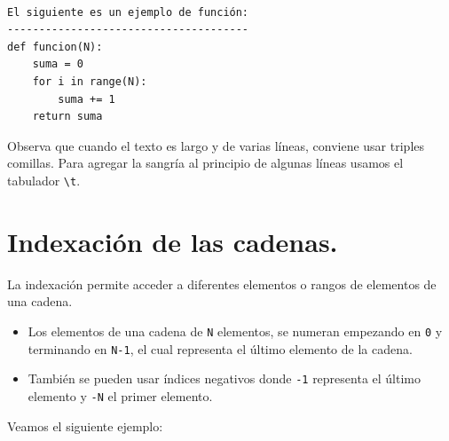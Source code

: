 \documentclass[
  spanish,
  letterpaper,
]{scrbook}
\providecommand{\tightlist}{%
  \setlength{\itemsep}{0pt}\setlength{\parskip}{0pt}}
\theoremstyle{definition}
\theoremstyle{remark}
\begin{document}
\begin{verbatim}

El siguiente es un ejemplo de función:
--------------------------------------
def funcion(N):
    suma = 0
    for i in range(N):
        suma += 1 
    return suma
\end{verbatim}

Observa que cuando el texto es largo y de varias líneas, conviene usar
triples comillas. Para agregar la sangría al principio de algunas líneas
usamos el tabulador \texttt{\textbackslash{}t}.

\section{Indexación de las cadenas.}\label{sec-e-indexacion-cadenas}

La indexación permite acceder a diferentes elementos o rangos de
elementos de una cadena.

\begin{itemize}
\tightlist
\item
  Los elementos de una cadena de \texttt{N} elementos, se numeran
  empezando en \texttt{0} y terminando en \texttt{N-1}, el cual
  representa el último elemento de la cadena.
\item
  También se pueden usar índices negativos donde \texttt{-1} representa
  el último elemento y \texttt{-N} el primer elemento.
\end{itemize}

Veamos el siguiente ejemplo:
\end{document}
